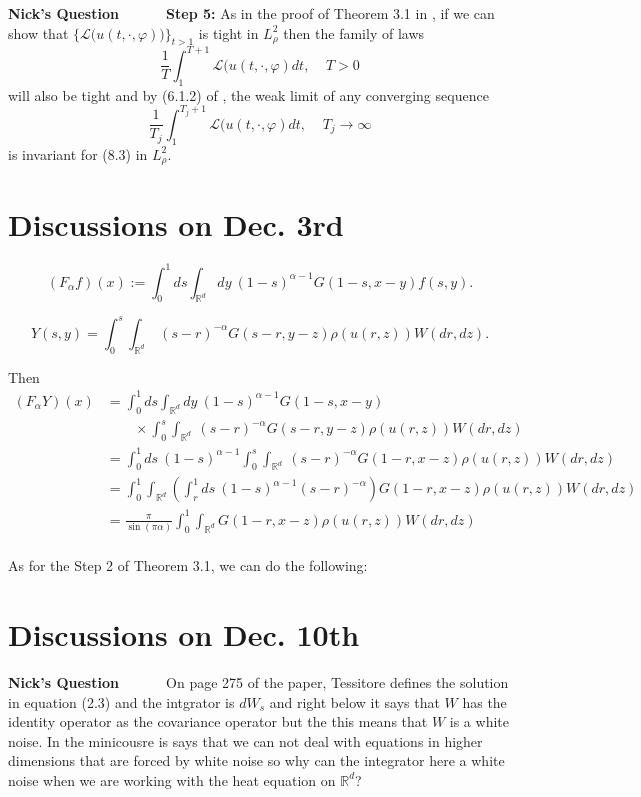 \documentclass[a4paper,11pt]{article}
\theoremstyle{plain}
\theoremstyle{definition}
\newcommand{\R}{\mathbb{R}}
\newcounter{NQ}
\newenvironment{NickQuestion}[1][] %
  {\refstepcounter{NQ}
  \begin{mdframed}[backgroundcolor=lightgray]\textbf{Nick's Question \theNQ \: #1~~}~~~\noindent}%
  {\end{mdframed}}
\numberwithin{NQ}{section}
\numberwithin{LQ}{section}
\numberwithin{ZQ}{section}
\begin{document}
\begin{NickQuestion}
\textbf{Step 5:} As in the proof of Theorem 3.1 in \cite{TessitoreZabczyk98M}, if we can show that $\{\mathscr L\big(u(t,\cdot,\varphi)\big)\}_{t>1}$ is tight in $L^2_\rho$ then the family of laws 
\begin{equation}
    \frac{1}{T}\int_1^{T+1}\mathscr L(u(t,\cdot,\varphi)dt, \;\;\;\; T>0
\end{equation}
will also be tight and by (6.1.2) of \cite{DZ96}, the weak limit of any converging sequence 
\begin{equation}
    \frac{1}{T_j}\int_1^{T_j+1}\mathscr L(u(t,\cdot,\varphi)dt, \;\;\;\; T_j \to \infty
\end{equation} 
is invariant for (8.3) in $L^2_\rho$.
\end{NickQuestion}


\section{Discussions on Dec. 3rd}

\[
\left(F_{\alpha} f\right)(x) := \int_0^1 ds \int_{\R^d} dy \: (1-s)^{\alpha-1}G(1-s,x-y)f(s,y) .
\]

\[
Y(s,y) =\int_0^s \int_{\R^d} \: (s-r)^{-\alpha}G(s-r,y-z)\rho(u(r,z))W(dr,dz).
\]

Then 
\begin{align*}
    \left(F_\alpha Y\right)(x) &= \int_0^1 ds \int_{\R^d} dy \: (1-s)^{\alpha-1}G(1-s,x-y)\\
    &\qquad\times\int_0^s \int_{\R^d} \: (s-r)^{-\alpha}G(s-r,y-z)\rho(u(r,z))W(dr,dz)\\
    &= \int_0^1 ds  \: (1-s)^{\alpha-1} \int_0^s \int_{\R^d} \: (s-r)^{-\alpha}G(1-r,x-z)\rho(u(r,z))W(dr,dz)\\
    &= \int_0^1  \int_{\R^d}  \left(\int_r^1 ds \: (1-s)^{\alpha-1}(s-r)^{-\alpha}\right)G(1-r,x-z)\rho(u(r,z))W(dr,dz)\\
        &= \frac{\pi}{\sin(\pi\alpha)}\int_0^1   \int_{\R^d} G(1-r,x-z)\rho(u(r,z))W(dr,dz)\\
\end{align*}

As for the Step 2 of Theorem 3.1, we can do the following: 

\section{Discussions on Dec. 10th}
\begin{NickQuestion}
On page 275 of the paper, Tessitore defines the solution in equation (2.3) and the intgrator is $dW_s$ and right below it says that $W$ has the identity operator as the covariance operator but the this means that $W$ is a white noise. In the minicousre is says that we can not deal with equations in higher dimensions that are forced by white noise so why can the integrator here a white noise when we are working with the heat equation on $\mathbb R^d$? 
\end{NickQuestion}
\end{document}
